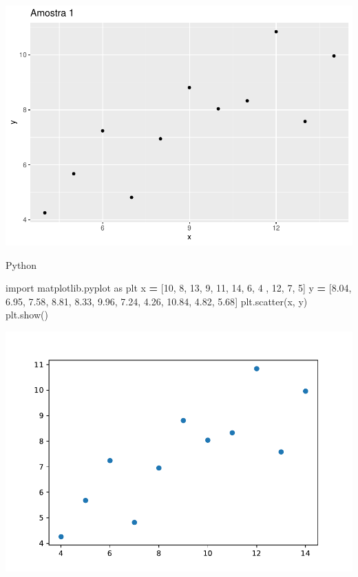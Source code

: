\documentclass[
]{book}
\newenvironment{Shaded}{\begin{snugshade}}{\end{snugshade}}
\newcommand{\DecValTok}[1]{\textcolor[rgb]{0.00,0.00,0.81}{#1}}
\newcommand{\FloatTok}[1]{\textcolor[rgb]{0.00,0.00,0.81}{#1}}
\newcommand{\ImportTok}[1]{#1}
\newcommand{\NormalTok}[1]{#1}
\newcommand{\OperatorTok}[1]{\textcolor[rgb]{0.81,0.36,0.00}{\textbf{#1}}}
\begin{document}
\includegraphics{_main_files/figure-latex/unnamed-chunk-8-1.pdf}

Python

\begin{Shaded}
\begin{Highlighting}[]
\ImportTok{import}\NormalTok{ matplotlib.pyplot }\ImportTok{as}\NormalTok{ plt}
\NormalTok{x }\OperatorTok{=}\NormalTok{ [}\DecValTok{10}\NormalTok{, }\DecValTok{8}\NormalTok{, }\DecValTok{13}\NormalTok{, }\DecValTok{9}\NormalTok{, }\DecValTok{11}\NormalTok{, }\DecValTok{14}\NormalTok{, }\DecValTok{6}\NormalTok{, }\DecValTok{4}\NormalTok{ , }\DecValTok{12}\NormalTok{, }\DecValTok{7}\NormalTok{, }\DecValTok{5}\NormalTok{]}
\NormalTok{y }\OperatorTok{=}\NormalTok{ [}\FloatTok{8.04}\NormalTok{, }\FloatTok{6.95}\NormalTok{, }\FloatTok{7.58}\NormalTok{, }\FloatTok{8.81}\NormalTok{, }\FloatTok{8.33}\NormalTok{, }\FloatTok{9.96}\NormalTok{, }\FloatTok{7.24}\NormalTok{, }\FloatTok{4.26}\NormalTok{, }\FloatTok{10.84}\NormalTok{, }\FloatTok{4.82}\NormalTok{, }\FloatTok{5.68}\NormalTok{]}
\NormalTok{plt.scatter(x, y)}
\NormalTok{plt.show()}
\end{Highlighting}
\end{Shaded}

\includegraphics{_main_files/figure-latex/unnamed-chunk-9-1.pdf}
\end{document}
